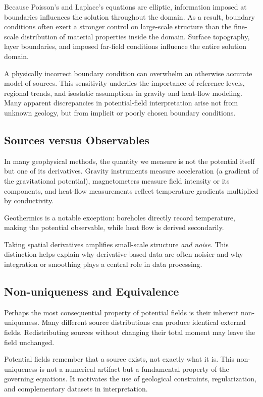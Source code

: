 Because Poisson's and Laplace's equations are elliptic, information imposed at boundaries influences the solution throughout the domain. As a result, boundary conditions often exert a stronger control on large-scale structure than the fine-scale distribution of material properties inside the domain. Surface topography, layer boundaries, and imposed far-field conditions influence the entire solution domain.

A physically incorrect boundary condition can overwhelm an otherwise accurate model of sources. This sensitivity underlies the importance of reference levels, regional trends, and isostatic assumptions in gravity and heat-flow modeling. Many apparent discrepancies in potential-field interpretation arise not from unknown geology, but from implicit or poorly chosen boundary conditions.

\subsection{Sources versus Observables}

In many geophysical methods, the quantity we measure is not the potential itself but one of its derivatives. Gravity instruments measure acceleration (a gradient of the gravitational potential), magnetometers measure field intensity or its components, and heat-flow measurements reflect temperature gradients multiplied by conductivity.

Geothermics is a notable exception: boreholes directly record temperature, making the potential observable, while heat flow is derived secondarily.

Taking spatial derivatives amplifies small-scale structure \emph{and noise}.  This distinction helps explain why derivative-based data are often noisier and why integration or smoothing plays a central role in data processing.

\subsection{Non-uniqueness and Equivalence}

Perhaps the most consequential property of potential fields is their inherent non-uniqueness. Many different source distributions can produce identical external fields. Redistributing sources without changing their total moment may leave the field unchanged.

Potential fields remember that a source exists, not exactly what it is.  This non-uniqueness is not a numerical artifact but a fundamental property of the governing equations. It motivates the use of geological constraints, regularization, and complementary datasets in interpretation.

